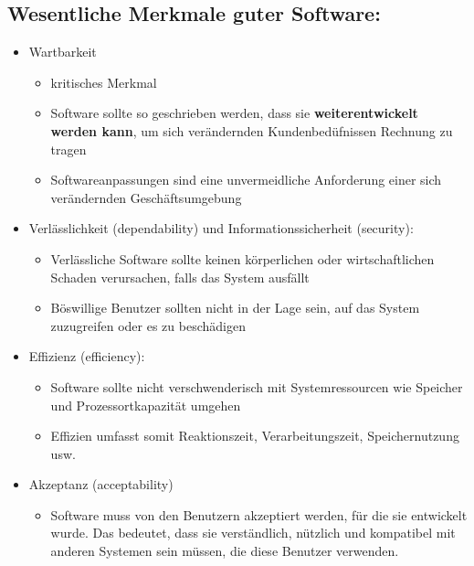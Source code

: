 \subsection{Wesentliche Merkmale guter Software:}
\begin{itemize}
    \item Wartbarkeit
    \begin{itemize}
        \item kritisches Merkmal 
        \item Software sollte so geschrieben werden, dass sie \textbf{weiterentwickelt werden kann}, um sich verändernden Kundenbedüfnissen Rechnung zu tragen
        \item Softwareanpassungen sind eine unvermeidliche Anforderung einer sich verändernden Geschäftsumgebung 
    \end{itemize}
    \item Verlässlichkeit (dependability) und Informationssicherheit (security):
    \begin{itemize}
        \item Verlässliche Software sollte keinen körperlichen oder wirtschaftlichen Schaden verursachen, falls das System ausfällt
        \item Böswillige Benutzer sollten nicht in der Lage sein, auf das System zuzugreifen oder es zu beschädigen
    \end{itemize}
    \item Effizienz (efficiency):
    \begin{itemize}
        \item Software sollte nicht verschwenderisch mit Systemressourcen wie Speicher und Prozessortkapazität umgehen
        \item Effizien umfasst somit Reaktionszeit, Verarbeitungszeit, Speichernutzung usw. 
    \end{itemize}
    \item Akzeptanz (acceptability)
    \begin{itemize}
        \item Software muss von den Benutzern akzeptiert werden, für die sie entwickelt wurde. Das bedeutet, dass sie verständlich, nützlich und kompatibel mit anderen Systemen sein müssen, die diese Benutzer verwenden.
    \end{itemize}
\end{itemize}
